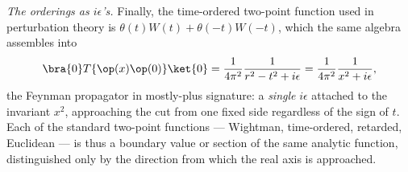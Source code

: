 \begin{eexample}
\emph{The orderings as $i\epsilon$'s.} Finally, the time-ordered two-point
function used in perturbation theory is $\theta(t)W(t) + \theta(-t)W(-t)$,
which the same algebra assembles into
\begin{equation}
\bra{0} T\{\op(x)\op(0)\}\ket{0} = \frac{1}{4\pi^2}
\frac{1}{r^2 - t^2 + i\epsilon} = \frac{1}{4\pi^2}\frac{1}{x^2 + i\epsilon},
\end{equation}
the Feynman propagator in mostly-plus signature: a \emph{single} $i\epsilon$
attached to the invariant $x^2$, approaching the cut from one fixed side
regardless of the sign of $t$. Each of the standard two-point functions ---
Wightman, time-ordered, retarded, Euclidean --- is thus a boundary value or
section of the same analytic function, distinguished only by the direction
from which the real axis is approached.
\end{eexample}

